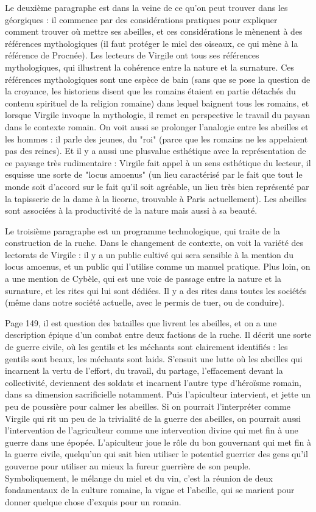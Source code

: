 \documentclass[a4paper,12pt]{book}
\begin{document}
\par Le deuxième paragraphe est dans la veine de ce qu'on peut trouver dans les géorgiques : il commence par des considérations pratiques pour expliquer comment trouver où mettre ses abeilles, et ces considérations le mènenent à des références mythologiques (il faut protéger le miel des oiseaux, ce qui mène à la référence de Procnée). Les lecteurs de Virgile ont tous ses références mythologiques, qui illustrent la cohérence entre la nature et la surnature. Ces références mythologiques sont une espèce de bain (sans que se pose la question de la croyance, les historiens disent que les romains étaient en partie détachés du contenu spirituel de la religion romaine) dans lequel baignent tous les romains, et lorsque Virgile invoque la mythologie, il remet en perspective le travail du paysan dans le contexte romain. On voit aussi se prolonger l'analogie entre les abeilles et les hommes : il parle des jeunes, du "roi" (parce que les romains ne les appelaient pas des reines). Et il y a aussi une plusvalue esthétique avec la représentation de ce paysage très rudimentaire : Virgile fait appel à un sens esthétique du lecteur, il esquisse une sorte de "locus amoenus" (un lieu caractérisé par le fait que tout le monde soit d'accord sur le fait qu'il soit agréable, un lieu très bien représenté par la tapisserie de la dame à la licorne, trouvable à Paris actuellement). Les abeilles sont associées à la productivité de la nature mais aussi à sa beauté.
\par Le troisième paragraphe est un programme technologique, qui traite de la construction de la ruche. Dans le changement de contexte, on voit la variété des lectorats de Virgile : il y a un public cultivé qui sera sensible à la mention du locus amoenus, et un public qui l'utilise comme un manuel pratique. Plus loin, on a une mention de Cybèle, qui est une voie de passage entre la nature et la surnature, et les rites qui lui sont dédiées. Il y a des rites dans toutes les sociétés (même dans notre société actuelle, avec le permis de tuer, ou de conduire).
\par Page 149, il est question des batailles que livrent les abeilles, et on a une description épique d'un combat entre deux factions de la ruche. Il décrit une sorte de guerre civile, où les gentils et les méchants sont clairement identifiés : les gentils sont beaux, les méchants sont laids. S'ensuit une lutte où les abeilles qui incarnent la vertu de l'effort, du travail, du partage, l'effacement devant la collectivité, deviennent des soldats et incarnent l'autre type d'héroïsme romain, dans sa dimension sacrificielle notamment. Puis l'apiculteur intervient, et jette un peu de poussière pour calmer les abeilles. Si on pourrait l'interpréter comme Virgile qui rit un peu de la trivialité de la guerre des abeilles, on pourrait aussi l'intervention de l'agriculteur comme une intervention divine qui met fin à une guerre dans une épopée. L'apiculteur joue le rôle du bon gouvernant qui met fin à la guerre civile, quelqu'un qui sait bien utiliser le potentiel guerrier des gens qu'il gouverne pour utiliser au mieux la fureur guerrière de son peuple. Symboliquement, le mélange du miel et du vin, c'est la réunion de deux fondamentaux de la culture romaine, la vigne et l'abeille, qui se marient pour donner quelque chose d'exquis pour un romain.
\end{document}

